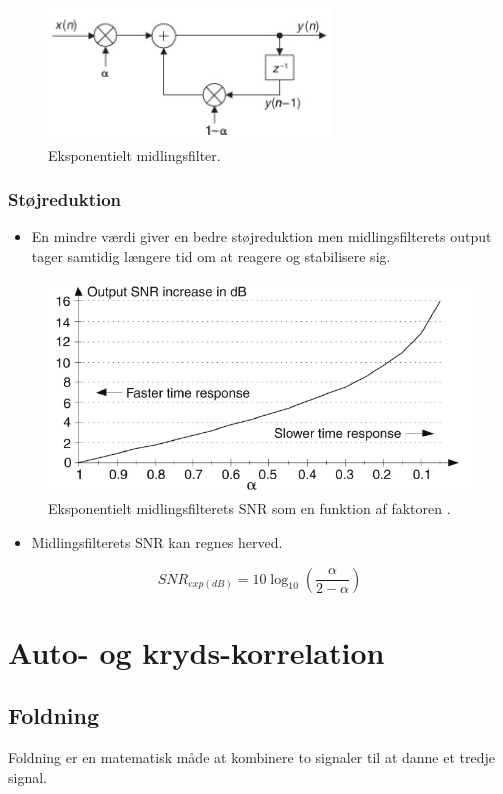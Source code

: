 \documentclass[danish]{article}
\begin{document}
\begin{figure} [H]
	\centering
	\includegraphics[width=0.4\linewidth]{graphics/exponentieltfilter}
	\caption{Eksponentielt midlingsfilter.}
	\label{fig:exponentieltfilter}
\end{figure}

\subsubsection{Støjreduktion}
\begin{itemize}
	\item En mindre \si{\alpha} værdi giver en bedre støjreduktion men midlingsfilterets output tager samtidig længere tid om at reagere og stabilisere sig. 
\end{itemize}

\begin{figure} [H]
	\centering
	\includegraphics[width=0.6\linewidth]{graphics/exp_snr}
	\caption{Eksponentielt midlingsfilterets SNR som en funktion af faktoren \si{\alpha}.}
	\label{fig:exp_snr}
\end{figure}

\begin{itemize}
	\item Midlingsfilterets SNR kan regnes herved.
\end{itemize}

\begin{equation}
SNR_{exp(dB)} = 10 \log_{10}\left(\dfrac{\si{\alpha}}{2-\si{\alpha}}\right)
\end{equation}

\newpage
\section{Auto- og kryds-korrelation}
\subsection{Foldning}
Foldning er en matematisk måde at kombinere to signaler til at danne et tredje signal.
\end{document}
